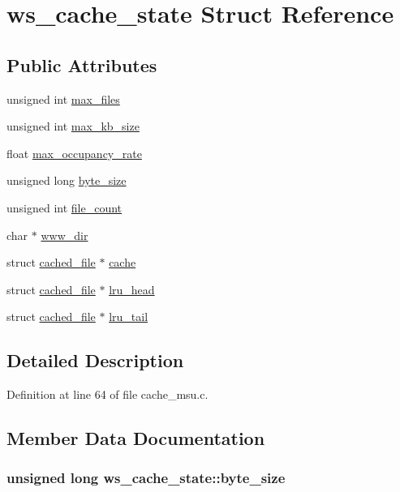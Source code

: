 \hypertarget{structws__cache__state}{\section{ws\-\_\-cache\-\_\-state Struct Reference}
\label{structws__cache__state}
}
\subsection*{Public Attributes}
\begin{DoxyCompactItemize}
\item 
unsigned int \hyperlink{structws__cache__state_aa02a5039b577f8928a97119ab2181b7c}{max\-\_\-files}
\item 
unsigned int \hyperlink{structws__cache__state_af2e1adc28ca4173da24578c5acdbea4a}{max\-\_\-kb\-\_\-size}
\item 
float \hyperlink{structws__cache__state_ac7d43653d289083c65b36964054cb567}{max\-\_\-occupancy\-\_\-rate}
\item 
unsigned long \hyperlink{structws__cache__state_a2fbf904a5d703b85597419cf26c14c3c}{byte\-\_\-size}
\item 
unsigned int \hyperlink{structws__cache__state_a35cf1432ae608a85c2179ad1c1cf2e19}{file\-\_\-count}
\item 
char $\ast$ \hyperlink{structws__cache__state_a6ff7b3a76f5436d08df63915fee176a0}{www\-\_\-dir}
\item 
struct \hyperlink{structcached__file}{cached\-\_\-file} $\ast$ \hyperlink{structws__cache__state_a3094652811095146a2dd8ccc48f62808}{cache}
\item 
struct \hyperlink{structcached__file}{cached\-\_\-file} $\ast$ \hyperlink{structws__cache__state_a44d8697d1655ab25a5d2d17866ccd2d4}{lru\-\_\-head}
\item 
struct \hyperlink{structcached__file}{cached\-\_\-file} $\ast$ \hyperlink{structws__cache__state_ab9d3f866382aa71681a0ff37b34ee442}{lru\-\_\-tail}
\end{DoxyCompactItemize}


\subsection{Detailed Description}


Definition at line 64 of file cache\-\_\-msu.\-c.



\subsection{Member Data Documentation}
\hypertarget{structws__cache__state_a2fbf904a5d703b85597419cf26c14c3c}{
\subsubsection[{byte\-\_\-size}]{\setlength{\rightskip}{0pt plus 5cm}unsigned long ws\-\_\-cache\-\_\-state\-::byte\-\_\-size}}\label{structws__cache__state_a2fbf904a5d703b85597419cf26c14c3c}


